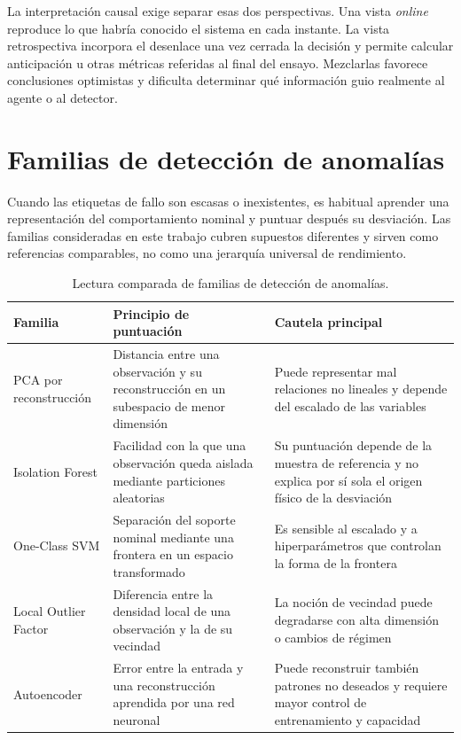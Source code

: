La interpretación causal exige separar esas dos perspectivas. Una vista
\textit{online} reproduce lo que habría conocido el sistema en cada instante. La
vista retrospectiva incorpora el desenlace una vez cerrada la decisión y permite
calcular anticipación u otras métricas referidas al final del ensayo. Mezclarlas
favorece conclusiones optimistas y dificulta determinar qué información guio
realmente al agente o al detector.

\section{Familias de detección de anomalías}

Cuando las etiquetas de fallo son escasas o inexistentes, es habitual aprender
una representación del comportamiento nominal y puntuar después su desviación.
Las familias consideradas en este trabajo cubren supuestos diferentes y sirven
como referencias comparables, no como una jerarquía universal de rendimiento.

\begin{table}[htbp]
\centering
\caption{Lectura comparada de familias de detección de anomalías.}\label{tab:familias_deteccion_estado_arte}
\small
\begin{tabularx}{\textwidth}{>{\raggedright\arraybackslash}p{}YY}
\toprule
Familia & Principio de puntuación & Cautela principal \\
\midrule
PCA por reconstrucción & Distancia entre una observación y su reconstrucción en
un subespacio de menor dimensión & Puede representar mal relaciones no lineales
y depende del escalado de las variables \\
Isolation Forest & Facilidad con la que una observación queda aislada mediante
particiones aleatorias & Su puntuación depende de la muestra de referencia y no
explica por sí sola el origen físico de la desviación \\
One-Class SVM & Separación del soporte nominal mediante una frontera en un
espacio transformado & Es sensible al escalado y a hiperparámetros que controlan
la forma de la frontera \\
Local Outlier Factor & Diferencia entre la densidad local de una observación y
la de su vecindad & La noción de vecindad puede degradarse con alta dimensión o
cambios de régimen \\
Autoencoder & Error entre la entrada y una reconstrucción aprendida por una red
neuronal & Puede reconstruir también patrones no deseados y requiere mayor
control de entrenamiento y capacidad \\
\bottomrule
\end{tabularx}
\end{table}


